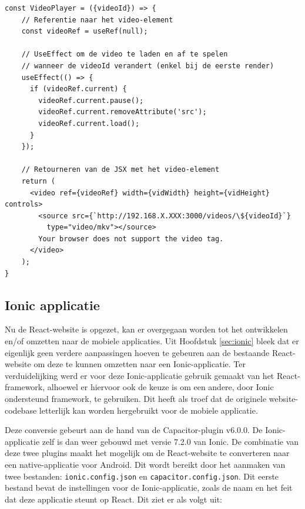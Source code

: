 \begin{mdframed}[backgroundcolor=bg]
  \begin{verbatim}
const VideoPlayer = ({videoId}) => {
    // Referentie naar het video-element
    const videoRef = useRef(null);

    // UseEffect om de video te laden en af te spelen
    // wanneer de videoId verandert (enkel bij de eerste render)
    useEffect(() => {
      if (videoRef.current) {
        videoRef.current.pause();
        videoRef.current.removeAttribute('src');
        videoRef.current.load();
      }
    });

    // Retourneren van de JSX met het video-element
    return (
      <video ref={videoRef} width={vidWidth} height={vidHeight} controls>
        <source src={`http://192.168.X.XXX:3000/videos/\${videoId}`}
          type="video/mkv"></source>
        Your browser does not support the video tag.
      </video>
    );
}
  \end{verbatim}
\end{mdframed}


\subsection{Ionic applicatie}
\label{sec:ionic-applicatie}

Nu de React-website is opgezet, kan er overgegaan worden tot het ontwikkelen en/of omzetten naar de mobiele applicaties. Uit Hoofdstuk \ref{sec:ionic} bleek dat er eigenlijk geen verdere aanpassingen hoeven te gebeuren aan de bestaande React-website om deze te kunnen omzetten naar een Ionic-applicatie. Ter verduidelijking werd er voor deze Ionic-applicatie gebruik gemaakt van het React-framework, alhoewel er hiervoor ook de keuze is om een andere, door Ionic ondersteund framework, te gebruiken. Dit heeft als troef dat de originele website-codebase letterlijk kan worden hergebruikt voor de mobiele applicatie.

Deze conversie gebeurt aan de hand van de Capacitor-plugin v6.0.0. De Ionic-applicatie zelf is dan weer gebouwd met versie 7.2.0 van Ionic. De combinatie van deze twee plugins maakt het mogelijk om de React-website te converteren naar een native-applicatie voor Android. Dit wordt bereikt door het aanmaken van twee bestanden: \verb|ionic.config.json| en \verb|capacitor.config.json|. Dit eerste bestand bevat de instellingen voor de Ionic-applicatie, zoals de naam en het feit dat deze applicatie steunt op React. Dit ziet er als volgt uit:

